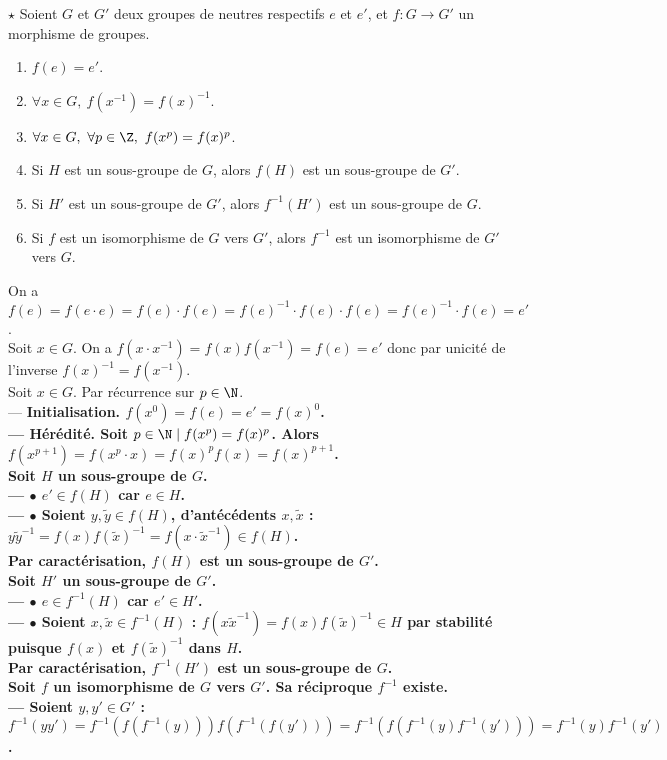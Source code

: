 \documentclass[11pt]{article}
\begin{document}
\begin{prop}{$\star$}{}
    Soient $G$ et $G'$ deux groupes de neutres respectifs $e$ et $e'$, et $f:G\to G'$ un morphisme de groupes.
    \begin{enumerate}
        \item $f(e)=e'$.
        \item $\forall x \in G, ~ f(x^{-1}) = f(x)^{-1}$.
        \item $\forall x \in G, ~ \forall p\in\Z, ~ f(x^p) = f(x)^p$.
        \item Si $H$ est un sous-groupe de $G$, alors $f(H)$ est un sous-groupe de $G'$.
        \item Si $H'$ est un sous-groupe de $G'$, alors $f^{-1}(H')$ est un sous-groupe de $G$.
        \item Si $f$ est un isomorphisme de $G$ vers $G'$, alors $f^{-1}$ est un isomorphisme de $G'$ vers $G$.
    \end{enumerate}
    \tcblower
     On a $f(e)=f(e\cdot e)=f(e)\cdot f(e) = f(e)^{-1}\cdot f(e)\cdot f(e)=f(e)^{-1}\cdot f(e)=e'$.\\
     Soit $x\in G$. On a $f(x\cdot x^{-1})=f(x)f(x^{-1})=f(e)=e'$ donc par unicité de l'inverse $f(x)^{-1}=f(x^{-1})$.\\
     Soit $x\in G$. Par récurrence sur $p\in\N$.\\
    --- \bf{Initialisation.} $f(x^0)=f(e)=e'=f(x)^0$.\\
    --- \bf{Hérédité.} Soit $p\in\N\mid f(x^p)=f(x)^p$. Alors $f(x^{p+1})=f(x^p\cdot x)=f(x)^pf(x)=f(x)^{p+1}$.\\
     Soit $H$ un sous-groupe de $G$.\\
    --- $\bullet$ $e'\in f(H)$ car $e\in H$.\\
    --- $\bullet$ Soient $y,\tilde{y}\in f(H)$, d'antécédents $x,\tilde{x}$ : $y\tilde{y}^{-1}=f(x)f(\tilde{x})^{-1}=f(x\cdot\tilde{x}^{-1})\in f(H)$.\\
    Par caractérisation, $f(H)$ est un sous-groupe de $G'$.\\
     Soit $H'$ un sous-groupe de $G'$.\\
    --- $\bullet$ $e\in f^{-1}(H)$ car $e'\in H'$.\\
    --- $\bullet$ Soient $x,\tilde{x}\in f^{-1}(H)$ : $f(x\tilde x^{-1})=f(x)f(\tilde{x})^{-1}\in H$ par stabilité puisque $f(x)$ et $f(\tilde{x})^{-1}$ dans $H$.\\
    Par caractérisation, $f^{-1}(H')$ est un sous-groupe de $G$.\\
     Soit $f$ un isomorphisme de $G$ vers $G'$. Sa réciproque $f^{-1}$ existe.\\
    --- Soient $y,y'\in G'$ : $f^{-1}(yy')=f^{-1}(f(f^{-1}(y)))f(f^{-1}(f(y')))=f^{-1}(f(f^{-1}(y)f^{-1}(y')))=f^{-1}(y)f^{-1}(y')$.
\end{prop}
\end{document}
